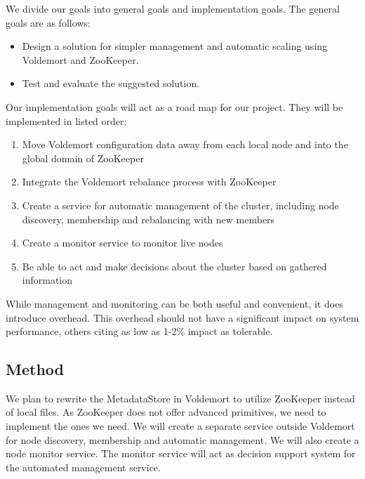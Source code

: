 We divide our goals into general goals and implementation goals. The general goals are as follows: 

\begin{itemize}
	\item{Design a solution for simpler management and automatic scaling using Voldemort and ZooKeeper.}
	\item{Test and evaluate the suggested solution.}
\end{itemize}

Our implementation goals will act as a road map for our project. They will be implemented in listed order:

\begin{enumerate}
	\item{Move Voldemort configuration data away from each local node and into the global domain of ZooKeeper}
	\item{Integrate the Voldemort rebalance process with ZooKeeper}
	\item{Create a service for automatic management of the cluster, including node discovery, membership and rebalancing with new members}
	\item{Create a monitor service to monitor live nodes}
	\item{Be able to act and make decisions about the cluster based on gathered information}
\end{enumerate}

While management and monitoring can be both useful and convenient, it does introduce overhead. This overhead should not have a significant impact on system performance, others citing as low as 1-2\% impact as tolerable\cite{Rabl:2012:SBD:2367502.2367512}.

\subsection{Method}
We plan to rewrite the MetadataStore in Voldemort to utilize ZooKeeper instead of local files. As ZooKeeper does not offer advanced primitives, we need to implement the ones we need. We will create a separate service outside Voldemort for node discovery, membership and automatic management. We will also create a node monitor service. The monitor service will act as decision support system for the automated management service. 

